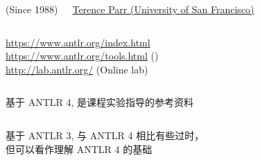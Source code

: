 \begin{frame}{}
  \begin{columns}
    \begin{center}
      (Since 1988)
    \end{center}
    \begin{center}
      \href{https://parrt.cs.usfca.edu/}{\small Terence Parr (University of San Francisco)}
    \end{center}
  \end{columns}

  \vspace{0.80cm}
  \begin{center}
    \url{https://www.antlr.org/index.html} \\[5pt]
    \url{https://www.antlr.org/tools.html} () \\[5pt]
    \url{http://lab.antlr.org/} (Online lab)
  \end{center}
\end{frame}

\begin{frame}{}
  \begin{columns}
  \end{columns}

  \vspace{0.50cm}
  \begin{center}
    基于 ANTLR 4, 是课程实验指导的参考资料
  \end{center}
\end{frame}

\begin{frame}{}
  \begin{columns}
  \end{columns}

  \vspace{0.50cm}
  \begin{center}
    基于 ANTLR 3, 与 ANTLR 4 相比有些过时，\\[3pt]
    但可以看作理解 ANTLR 4 的基础
  \end{center}
\end{frame}


